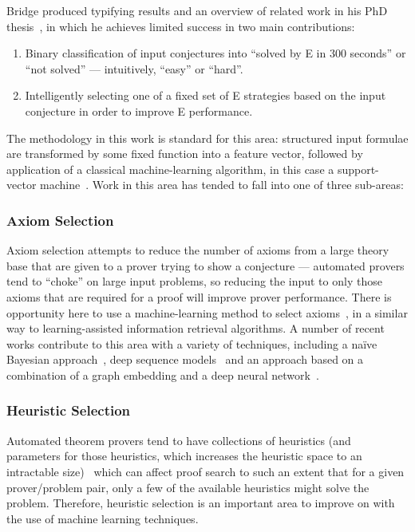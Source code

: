 \documentclass[a4paper, 10pt]{article}
\begin{document}
Bridge produced typifying results and an overview of related work in his PhD thesis~\cite{bridge}, in which he achieves limited success in two main contributions:
\begin{enumerate}
	\item Binary classification of input conjectures into ``solved by E in 300 seconds'' or ``not solved'' --- intuitively, ``easy'' or ``hard''.
	\item Intelligently selecting one of a fixed set of E strategies based on the input conjecture in order to improve E performance.
\end{enumerate}
The methodology in this work is standard for this area: structured input formulae are transformed by some fixed function into a feature vector, followed by application of a classical machine-learning algorithm, in this case a support-vector machine~\cite{SVM}.
Work in this area has tended to fall into one of three sub-areas:

\subsubsection{Axiom Selection}
Axiom selection attempts to reduce the number of axioms from a large theory base that are given to a prover trying to show a conjecture --- automated provers tend to ``choke'' on large input problems, so reducing the input to only those axioms that are required for a proof will improve prover performance.
There is opportunity here to use a machine-learning method to select axioms~\cite{axiom-selection-survey}, in a similar way to learning-assisted information retrieval algorithms.
A number of recent works contribute to this area with a variety of techniques, including a na\"ive Bayesian approach~\cite{axiom-selection-bayes, axiom-selection-sledgehammer}, deep sequence models~\cite{axiom-selection-sequence} and an approach based on a combination of a graph embedding and a deep neural network~\cite{axiom-selection-graph}.

\subsubsection{Heuristic Selection}
Automated theorem provers tend to have collections of heuristics (and parameters for those heuristics, which increases the heuristic space to an intractable size)~\cite{MaLeS} which can affect proof search to such an extent that for a given prover/problem pair, only a few of the available heuristics might solve the problem.
Therefore, heuristic selection is an important area to improve on with the use of machine learning techniques.
\end{document}
